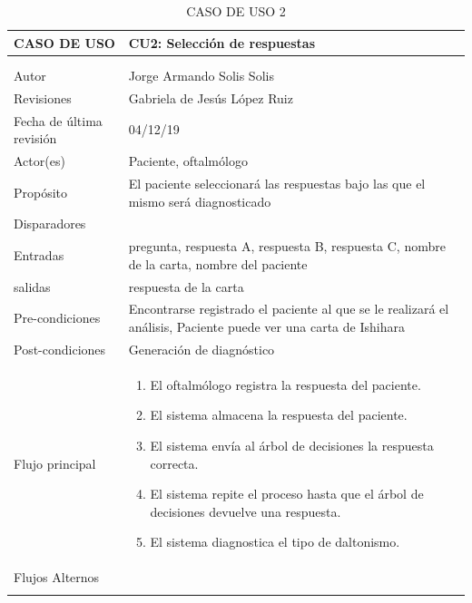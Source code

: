 \documentclass[10pt]{article}
\begin{document}
\begin{longtable}{|p{3.8cm}|p{10.8cm}|}
\hline
CASO DE USO & CU2: Selección de respuestas\\
\hline 
\endfirsthead

\hline

 & \\
\hline 
\endhead

\multicolumn{2}{c}{}
\endfoot

\endlastfoot
\hline
versión & 1\\
\hline
Autor & Jorge Armando Solis Solis\\
\hline
Revisiones & Gabriela de Jesús López Ruiz \\
\hline
Fecha de última revisión & 04/12/19\\
\hline
Actor(es) & Paciente, oftalmólogo \\
\hline
Propósito & El paciente seleccionará las respuestas bajo las que el mismo será diagnosticado \\
\hline
Disparadores & \\
\hline
Entradas & pregunta, respuesta A, respuesta B, respuesta C, nombre de la carta, nombre del paciente\\
\hline
salidas & respuesta de la carta\\
\hline
Pre-condiciones & Encontrarse registrado el paciente al que se le realizará el análisis, Paciente puede ver una carta de Ishihara \\
\hline
Post-condiciones & Generación de diagnóstico\\
\hline
Flujo principal & \begin{enumerate}
    \item El oftalmólogo registra la respuesta del paciente.
    \item El sistema almacena la respuesta del paciente.
    \item El sistema envía al árbol de decisiones la respuesta correcta.
    \item El sistema repite el proceso hasta que el árbol de decisiones devuelve una respuesta.
    \item El sistema diagnostica el tipo de daltonismo.
\end{enumerate}
    \\
\hline
Flujos Alternos & \\
\hline
\caption{CASO DE USO 2}
\label{tabla1}
\end{longtable}
\end{document}
